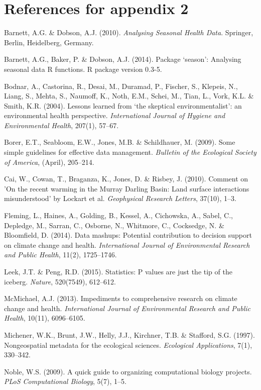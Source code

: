 \documentclass[11pt,a4paper]{article}
\begin{document}
\clearpage

\section{References for appendix 2}\label{references-for-appendix-2}

Barnett, A.G. \& Dobson, A.J. (2010). \emph{Analysing Seasonal Health
Data}. Springer, Berlin, Heidelberg, Germany.

Barnett, A.G., Baker, P. \& Dobson, A.J. (2014). Package `season':
Analysing seasonal data R functions. R package version 0.3-5.

Bodnar, A., Castorina, R., Desai, M., Duramad, P., Fischer, S., Klepeis,
N., Liang, S., Mehta, S., Naumoff, K., Noth, E.M., Schei, M., Tian, L.,
Vork, K.L. \& Smith, K.R. (2004). Lessons learned from `the skeptical
environmentalist': an environmental health perspective.
\emph{International Journal of Hygiene and Environmental Health},
207(1), 57--67.

Borer, E.T., Seabloom, E.W., Jones, M.B. \& Schildhauer, M. (2009). Some
simple guidelines for effective data management. \emph{Bulletin of the
Ecological Society of America}, (April), 205--214.

Cai, W., Cowan, T., Braganza, K., Jones, D. \& Risbey, J. (2010).
Comment on 'On the recent warming in the Murray Darling Basin: Land
surface interactions misunderstood' by Lockart et al. \emph{Geophysical
Research Letters}, 37(10), 1--3.

Fleming, L., Haines, A., Golding, B., Kessel, A., Cichowska, A., Sabel,
C., Depledge, M., Sarran, C., Osborne, N., Whitmore, C., Cocksedge, N.
\& Bloomfield, D. (2014). Data mashups: Potential contribution to
decision support on climate change and health. \emph{International
Journal of Environmental Research and Public Health}, 11(2), 1725--1746.

Leek, J.T. \& Peng, R.D. (2015). Statistics: P values are just the tip
of the iceberg. \emph{Nature}, 520(7549), 612--612.

McMichael, A.J. (2013). Impediments to comprehensive research on climate
change and health. \emph{International Journal of Environmental Research
and Public Health}, 10(11), 6096--6105.

Michener, W.K., Brunt, J.W., Helly, J.J., Kirchner, T.B. \& Stafford,
S.G. (1997). Nongeospatial metadata for the ecological sciences.
\emph{Ecological Applications}, 7(1), 330--342.

Noble, W.S. (2009). A quick guide to organizing computational biology
projects. \emph{PLoS Computational Biology}, 5(7), 1--5.
\end{document}
